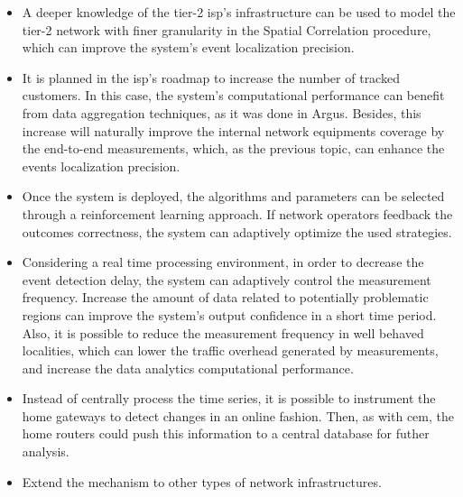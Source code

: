 \begin{itemize}
\item
A deeper knowledge of the tier-2 \gls*{isp}'s infrastructure
can be used to model the tier-2 network with finer granularity in the Spatial
Correlation procedure, which can improve the system's event localization
precision.

\item
It is planned in the \gls*{isp}'s roadmap to increase the number of tracked customers.
In this case, the system's computational performance can benefit from data
aggregation techniques, as it was done in Argus.
Besides, this increase will naturally improve the internal network equipments
coverage by the end-to-end measurements, which, as the previous topic, can
enhance the events localization precision.

\item
Once the system is deployed, the algorithms and parameters can be selected
through a reinforcement learning approach. If network operators
feedback the outcomes correctness, the system can adaptively optimize the used
strategies.

\item
Considering a real time processing environment, in order to decrease the
event detection delay, the system can adaptively control the measurement
frequency.
Increase the amount of data related to potentially problematic regions
can improve the system's output confidence in a short time period.
Also, it is possible to reduce the measurement frequency in well behaved
localities, which can lower the traffic overhead generated by measurements, and
increase the data analytics computational performance.

\item
Instead of centrally process the time series,
it is possible to instrument the home
gateways to detect changes in an online fashion. Then, as with \gls*{cem}, the home
routers could push this information to a central database for futher analysis.

\item
Extend the mechanism to other types of network infrastructures.

\end{itemize}
